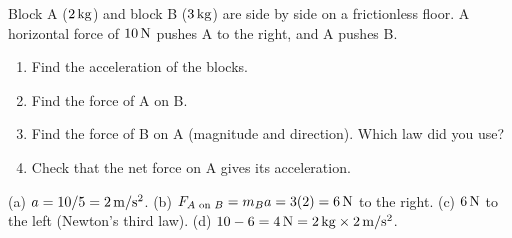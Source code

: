 \begin{exo}{}
Block A ($2\,\mathrm{kg}$) and block B ($3\,\mathrm{kg}$) are side by side on a frictionless floor. A horizontal force of $10\,\mathrm{N}$ pushes A to the right, and A pushes B.
\begin{enumerate}[label=(\alph*)]
\item Find the acceleration of the blocks.
\item Find the force of A on B.
\item Find the force of B on A (magnitude and direction). Which law did you use?
\item Check that the net force on A gives its acceleration.
\end{enumerate}
\work{4.5cm}
\begin{solution}
(a) $a=10/5=2\,\mathrm{m/s^2}$. \;(b) $F_{A\text{ on }B}=m_Ba=3(2)=6\,\mathrm{N}$ to the right. \;(c) $6\,\mathrm{N}$ to the left (Newton's third law). \;(d) $10-6=4\,\mathrm{N}=2\,\mathrm{kg}\times2\,\mathrm{m/s^2}$. \checkmark
\end{solution}
\end{exo}

